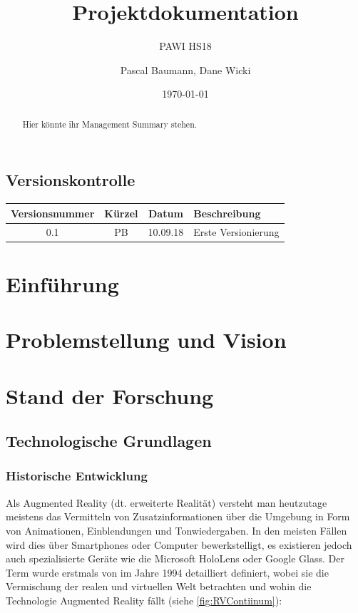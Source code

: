 \documentclass[a4paper]{scrreprt}
\title{Projektdokumentation}
\subtitle{PAWI HS18}
\author{Pascal Baumann, Dane Wicki}
\date{\today}
\begin{document}
\begin{titlepage}
\maketitle
\end{titlepage}

\renewcommand{\abstractname}{Management Summary}
\begin{abstract}
	Hier könnte ihr Management Summary stehen.
\end{abstract}

\section*{Versionskontrolle}

\begin{tabularx}{\textwidth}{|c|c|c|X|}
	\hline
	\textbf{Versionsnummer} & \textbf{Kürzel} & \textbf{Datum} & \textbf{Beschreibung} \\
	\hline
	0.1 & PB & 10.09.18 & Erste Versionierung \\
	\hline
\end{tabularx}

\tableofcontents

\chapter{Einführung}

\chapter{Problemstellung und Vision}

\chapter{Stand der Forschung}

\section{Technologische Grundlagen}

\subsection{Historische Entwicklung}
Als Augmented Reality (dt. erweiterte Realität) versteht man heutzutage meistens das Vermitteln von Zusatzinformationen über die Umgebung in Form von Animationen, Einblendungen und Tonwiedergaben. In den meisten Fällen wird dies über Smartphones oder Computer bewerkstelligt, es existieren jedoch auch spezialisierte Geräte wie die Microsoft HoloLens oder Google Glass. Der Term wurde erstmals von \citeauthor{Milgram1994} im Jahre 1994 detailliert definiert, wobei sie die Vermischung der realen und virtuellen Welt betrachten und wohin die Technologie Augmented Reality fällt (siehe \ref{fig:RVContiinum}):
\end{document}
